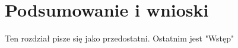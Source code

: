 \chapter[Podsumowanie i wnioski]{Podsumowanie i wnioski}

\label{chapter:wnioski}

Ten rozdział pisze się jako przedostatni.
    Ostatnim jest "Wstęp"